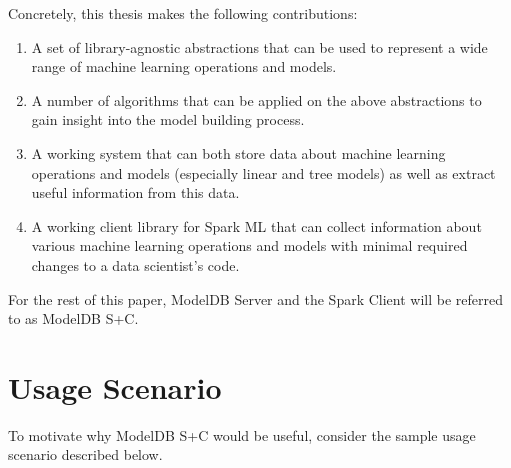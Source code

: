 Concretely, this thesis makes the following contributions:

\begin{enumerate}
  \item A set of library-agnostic abstractions that can be used to
    represent a wide range of machine learning operations and models.
  \item A number of algorithms that can be applied on the above abstractions
    to gain insight into the model building process.
  \item A working system that can both store data about 
    machine learning operations and models (especially linear and tree models) 
    as well as extract useful information from this data.
  \item A working client library for Spark ML that can collect information 
    about various  machine learning operations and models with 
    minimal required changes to a data scientist's code.
\end{enumerate}

For the rest of this paper, ModelDB Server and the Spark Client will be referred
to as ModelDB S+C.

\section{Usage Scenario}
To motivate why ModelDB S+C would be useful, consider the sample usage scenario
described below.


